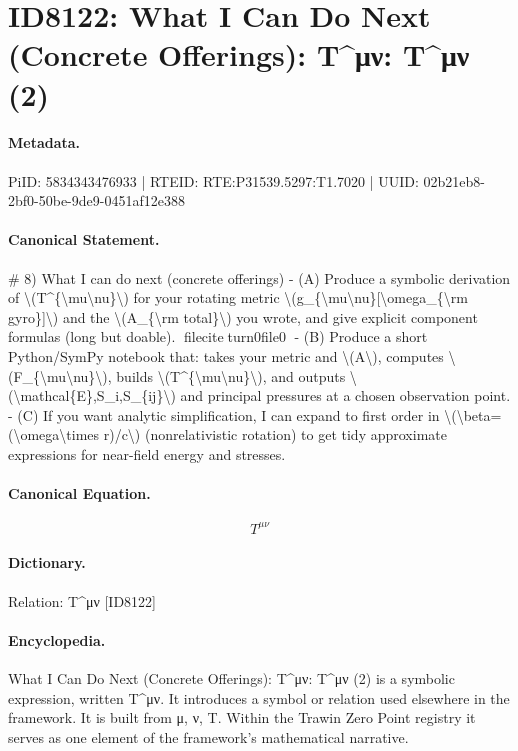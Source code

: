 \section*{ID8122: What I Can Do Next (Concrete Offerings): T\textasciicircum{}μν: T\textasciicircum{}μν (2)}
\paragraph{Metadata.}
PiID: 5834343476933 | RTEID: RTE:P31539.5297:T1.7020 | UUID: 02b21eb8-2bf0-50be-9de9-0451af12e388

\paragraph{Canonical Statement.}
\# 8) What I can do next (concrete offerings) - (A) Produce a symbolic derivation of \textbackslash{}(T\textasciicircum{}\{\textbackslash{}mu\textbackslash{}nu\}\textbackslash{}) for your rotating metric \textbackslash{}(g\_\{\textbackslash{}mu\textbackslash{}nu\}[\textbackslash{}omega\_\{\textbackslash{}rm gyro\}]\textbackslash{}) and the \textbackslash{}(A\_\{\textbackslash{}rm total\}\textbackslash{}) you wrote, and give explicit component formulas (long but doable). fileciteturn0file0 - (B) Produce a short Python/SymPy notebook that: takes your metric and \textbackslash{}(A\textbackslash{}), computes \textbackslash{}(F\_\{\textbackslash{}mu\textbackslash{}nu\}\textbackslash{}), builds \textbackslash{}(T\textasciicircum{}\{\textbackslash{}mu\textbackslash{}nu\}\textbackslash{}), and outputs \textbackslash{}(\textbackslash{}mathcal\{E\},S\_i,S\_\{ij\}\textbackslash{}) and principal pressures at a chosen observation point. - (C) If you want analytic simplification, I can expand to first order in \textbackslash{}(\textbackslash{}beta=(\textbackslash{}omega\textbackslash{}times r)/c\textbackslash{}) (nonrelativistic rotation) to get tidy approximate expressions for near-field energy and stresses.

\paragraph{Canonical Equation.}
\[
T^{\mu\nu}
\]

\paragraph{Dictionary.}
Relation: T\textasciicircum{}μν [ID8122]

\paragraph{Encyclopedia.}
What I Can Do Next (Concrete Offerings): T\textasciicircum{}μν: T\textasciicircum{}μν (2) is a symbolic expression, written T\textasciicircum{}μν. It introduces a symbol or relation used elsewhere in the framework. It is built from μ, ν, T. Within the Trawin Zero Point registry it serves as one element of the framework's mathematical narrative.
